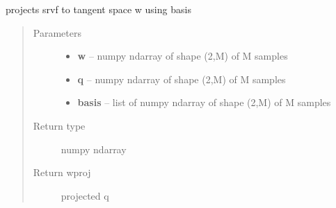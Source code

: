 \documentclass[letterpaper,10pt,english]{sphinxmanual}
\begin{document}

\begin{fulllineitems}
\label{geodesic:geodesic.project_tangent}
projects srvf to tangent space w using basis
\begin{quote}\begin{description}
\item[{Parameters}] \leavevmode\begin{itemize}
\item {} 
\textbf{w} -- numpy ndarray of shape (2,M) of M samples

\item {} 
\textbf{q} -- numpy ndarray of shape (2,M) of M samples

\item {} 
\textbf{basis} -- list of numpy ndarray of shape (2,M) of M samples

\end{itemize}

\item[{Return type}] \leavevmode
numpy ndarray

\item[{Return wproj}] \leavevmode
projected q

\end{description}\end{quote}

\end{fulllineitems}

\end{document}
